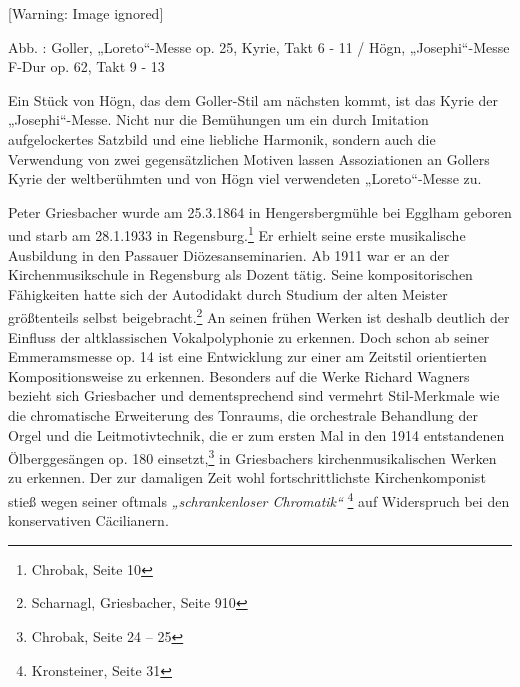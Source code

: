 \documentclass[a4paper]{article}
\newcounter{Abb}
\renewcommand\theAbb{\arabic{Abb}}
\begin{document}
  [Warning: Image ignored] %
 

Abb. \stepcounter{Abb}{\theAbb}: Goller, „Loreto“-Messe op. 25, Kyrie,
Takt 6 - 11 / Högn, „Josephi“-Messe F-Dur op. 62, Takt 9 - 13

Ein Stück von Högn, das dem Goller-Stil am nächsten kommt, ist das Kyrie
der „Josephi“-Messe. Nicht nur die Bemühungen um ein durch Imitation
aufgelockertes Satzbild und eine liebliche Harmonik, sondern auch die
Verwendung von zwei gegensätzlichen Motiven lassen Assoziationen an
Gollers Kyrie der weltberühmten und von Högn viel verwendeten
„Loreto“-Messe zu. 

Peter Griesbacher wurde am 25.3.1864 in Hengersbergmühle bei Egglham
geboren und starb am 28.1.1933 in Regensburg.\footnote{ Chrobak, Seite
10} Er erhielt seine erste musikalische Ausbildung in den Passauer
Diözesanseminarien. Ab 1911 war er an der Kirchenmusikschule in
Regensburg als Dozent tätig. Seine kompositorischen Fähigkeiten hatte
sich der Autodidakt durch Studium der alten Meister größtenteils selbst
beigebracht.\footnote{ Scharnagl, Griesbacher, Seite 910} An seinen
frühen Werken ist deshalb deutlich der Einfluss der altklassischen
Vokalpolyphonie zu erkennen. Doch schon ab seiner Emmeramsmesse op. 14
ist eine Entwicklung zur einer am Zeitstil orientierten
Kompositionsweise zu erkennen. Besonders auf die Werke Richard Wagners
bezieht sich Griesbacher und dementsprechend sind vermehrt
Stil-Merkmale wie die chromatische Erweiterung des Tonraums, die
orchestrale Behandlung der Orgel und die Leitmotivtechnik, die er zum
ersten Mal in den 1914 entstandenen Ölberggesängen op. 180
einsetzt,\footnote{ Chrobak, Seite 24 – 25} in Griesbachers
kirchenmusikalischen Werken zu erkennen. Der zur damaligen Zeit wohl
fortschrittlichste Kirchenkomponist stieß wegen seiner oftmals
\textit{„schrankenloser Chromatik“ }\footnote{ Kronsteiner, Seite 31}
auf Widerspruch bei den konservativen Cäcilianern.
\end{document}
